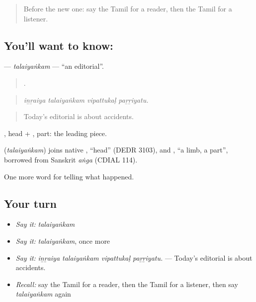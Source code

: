 \label{lesson:TA-C309-talaiyankam}



\begin{quote}
Before the new one: say the Tamil for a reader, then the Tamil for a listener.
\end{quote}

\subsection*{You'll want to know: }
\textbf{} — \emph{talaiyaṅkam} — \textquotedblleft{}an editorial\textquotedblright{}.

\begin{quote}
   .
\end{quote}

\begin{quote}
\emph{iṉṟaiya talaiyaṅkam vipattukaḷ paṟṟiyatu.}
\end{quote}

\begin{quote}
Today's editorial is about accidents.
\end{quote}

, head + , part: the leading piece.

\begin{cousinweb}
\textbf{} (\emph{talaiyaṅkam}) joins native , \textquotedblleft{}head\textquotedblright{} (DEDR 3103), and , \textquotedblleft{}a limb, a part\textquotedblright{}, borrowed from Sanskrit \emph{aṅga} (CDIAL 114).
\end{cousinweb}

\begin{grammarlens}[title={What you've built}]
One more word for telling what happened.
\end{grammarlens}

\subsection*{Your turn}
\begin{itemize}
\raggedright
  \item \emph{Say it:} \emph{talaiyaṅkam}
  \item \emph{Say it:} \emph{talaiyaṅkam}, once more
  \item \emph{Say it:} \emph{iṉṟaiya talaiyaṅkam vipattukaḷ paṟṟiyatu.} — Today's editorial is about accidents.
  \item \emph{Recall:} say the Tamil for a reader, then the Tamil for a listener, then say \emph{talaiyaṅkam} again
\end{itemize}

